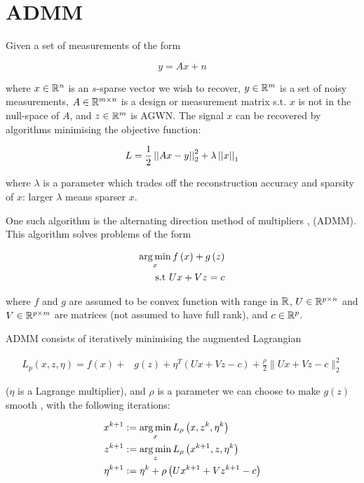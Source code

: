 \documentclass{article}
\begin{document}
\section{ADMM}

Given a set of measurements of the form

\begin{equation}
y = Ax + n 
\end{equation}

where \(x \in {\mathbb{R}}^n\) is an \(s\)-sparse vector we wish to recover, \(y \in {\mathbb{R}}^m\) is a set of noisy measurements, \(A \in {\mathbb{R}}^{m \times n}\) is a design or measurement matrix s.t. \(x\) is not in the null-space of \(A\), and \(z \in {\mathbb{R}}^m\) is AGWN. The signal \(x\) can be recovered by algorithms minimising the objective function:

\begin{equation}
L = \frac{1}{2} \left|\left|Ax-y\right|\right|_2^2 + \lambda\left|\left|x\right|\right|_1
\label{LASSO}
\end{equation}

where \(\lambda\) is a parameter which trades off the reconstruction accuracy and sparsity of \(x\): larger \(\lambda\) means sparser \(x\). 

One such algorithm is the alternating direction method of multipliers \cite{Boyd2010a}, (ADMM). This algorithm solves problems of the form

\begin{align}
\operatorname*{arg\,min}_{x} f\left( x \right) + g\left(z\right) \nonumber
\\
\text{s.t } Ux +Vz = c
\label{admm}
\end{align}

where \(f\) and \(g\) are assumed to be convex function with range in \({\mathbb{R}}\), \(U \in {\mathbb{R}}^{p \times n}\) and \(V\in {\mathbb{R}}^{p \times m}\) are matrices (not assumed to have full rank), and \(c \in {\mathbb{R}}^p\).

ADMM consists of iteratively minimising the augmented Lagrangian 

\begin{align*}
L_p\left(x, z, \eta\right) = f\left( x\right) +& g\left(z\right)+\eta^T\left(Ux+Vz-c\right) + \frac{\rho}{2}\|Ux+Vz-c\|_2^2
\label{admm_form}
\end{align*}

(\(\eta\) is a Lagrange multiplier), and \(\rho\) is a parameter we can choose to make \(g(z)\) smooth \cite{nesterov2005smooth}, with the following iterations:

\begin{align}
x^{k+1} &:= \operatorname*{arg\,min}_{x} L_\rho\left(x,z^k,\eta^k\right)\\
z^{k+1} &:= \operatorname*{arg\,min}_{z} L_\rho\left(x^{k+1},z,\eta^k\right)\\
\eta^{k+1} &:= \eta^{k} + \rho \left(Ux^{k+1} + Vz^{k+1} - c\right)
\label{admm_algo}
\end{align}
\end{document}
